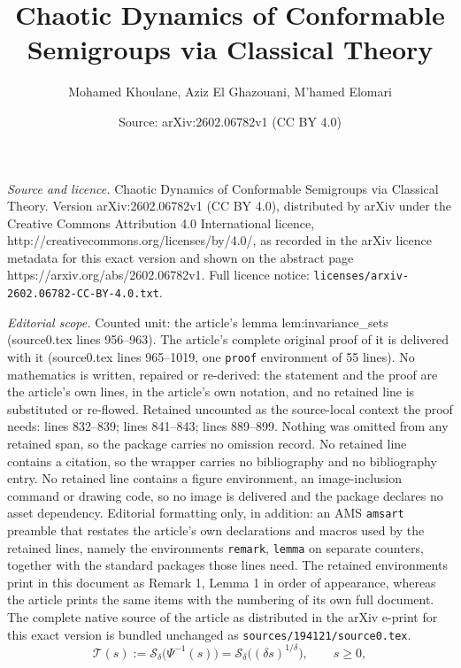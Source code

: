 \documentclass[10pt,a4paper]{amsart}
\title{Chaotic Dynamics of Conformable Semigroups via Classical Theory}
\author{Mohamed Khoulane, Aziz El Ghazouani, M'hamed Elomari}
\date{Source: arXiv:2602.06782v1 (CC BY 4.0)}
\begin{document}
\maketitle

\noindent\emph{Source and licence.} Chaotic Dynamics of Conformable Semigroups via Classical Theory. Version arXiv:2602.06782v1 (CC BY 4.0), distributed by arXiv under the Creative Commons Attribution 4.0 International licence, http://creativecommons.org/licenses/by/4.0/, as recorded in the arXiv licence metadata for this exact version and shown on the abstract page https://arxiv.org/abs/2602.06782v1. Full licence notice: \texttt{licenses/arxiv-2602.06782-CC-BY-4.0.txt}.\par\smallskip

\noindent\textit{Editorial scope.} Counted unit: the article's lemma lem:invariance\_sets (source0.tex lines 956--963). The article's complete original proof of it is delivered with it (source0.tex lines 965--1019, one \texttt{proof} environment of 55 lines). No mathematics is written, repaired or re-derived: the statement and the proof are the article's own lines, in the article's own notation, and no retained line is substituted or re-flowed.  Retained uncounted as the source-local context the proof needs: lines 832--839; lines 841--843; lines 889--899.  Nothing was omitted from any retained span, so the package carries no omission record.  No retained line contains a citation, so the wrapper carries no bibliography and no bibliography entry.  No retained line contains a figure environment, an image-inclusion command or drawing code, so no image is delivered and the package declares no asset dependency.  Editorial formatting only, in addition: an AMS \texttt{amsart} preamble that restates the article's own declarations and macros used by the retained lines, namely the environments \texttt{remark}, \texttt{lemma} on separate counters, together with the standard packages those lines need.  The retained environments print in this document as Remark 1, Lemma 1 in order of appearance, whereas the article prints the same items with the numbering of its own full document.  The complete native source of the article as distributed in the arXiv e-print for this exact version is bundled unchanged as \texttt{sources/194121/source0.tex}.
\begin{equation}\label{eq:defT}
\mathcal T(s)
:=
\mathcal S_\delta\!\bigl(\Psi^{-1}(s)\bigr)
=
\mathcal S_\delta\!\bigl((\delta s)^{1/\delta}\bigr),
\qquad s\ge0,
\end{equation}
\end{document}
